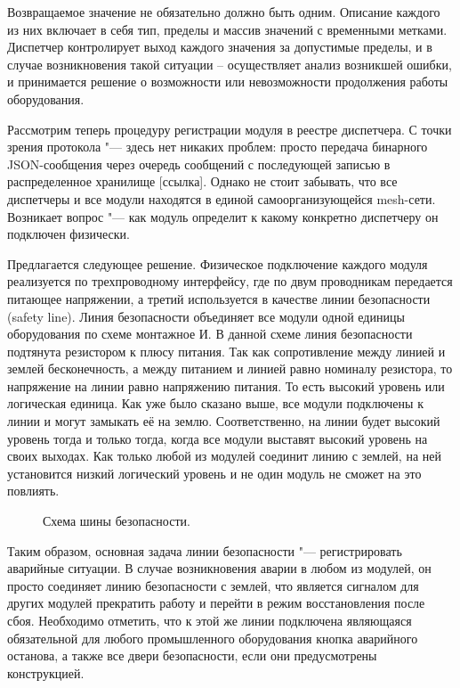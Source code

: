 Возвращаемое значение не обязательно должно быть одним. Описание каждого из них включает в себя тип, пределы и массив значений с временными метками. Диспетчер контролирует выход каждого значения за допустимые пределы, и в случае возникновения такой ситуации – осуществляет анализ возникшей ошибки, и принимается решение о возможности или невозможности продолжения работы оборудования.

Рассмотрим теперь процедуру регистрации модуля в реестре диспетчера. С точки зрения протокола "--- здесь нет никаких проблем: просто передача бинарного JSON-сообщения через очередь сообщений с последующей записью в распределенное хранилище [ссылка]. Однако не стоит забывать, что все диспетчеры и все модули находятся в единой самоорганизующейся mesh-сети. Возникает вопрос "--- как модуль определит к какому конкретно диспетчеру он подключен физически.

Предлагается следующее решение. Физическое подключение каждого модуля реализуется по трехпроводному интерфейсу, где по двум проводникам передается питающее напряжении, а третий используется в качестве линии безопасности (safety line). Линия безопасности объединяет все модули одной единицы оборудования по схеме монтажное И. В данной схеме линия безопасности подтянута резистором к плюсу питания. Так как сопротивление между линией и землей бесконечность, а между питанием и линией равно номиналу резистора, то напряжение на линии равно напряжению питания. То есть высокий уровень или логическая единица. Как уже было сказано выше, все модули подключены к линии и могут замыкать её на землю. Соответственно, на линии будет высокий уровень тогда и только тогда, когда все модули выставят высокий уровень на своих выходах. Как только любой из модулей соединит линию с землей, на ней установится низкий логический уровень и не один модуль не сможет на это повлиять.

\begin{figure}[ht]
\caption{Схема шины безопасности.}\label{fig:logic-and}
\end{figure}

Таким образом, основная задача линии безопасности "--- регистрировать аварийные ситуации. В случае возникновения аварии в любом из модулей, он просто соединяет линию безопасности с землей, что является сигналом для других модулей прекратить работу и перейти в режим восстановления после сбоя. Необходимо отметить, что к этой же линии подключена являющаяся обязательной для любого промышленного оборудования кнопка аварийного останова, а также все двери безопасности, если они предусмотрены конструкцией.

